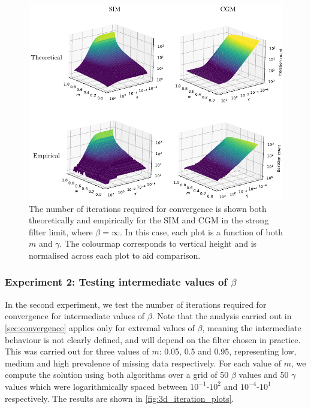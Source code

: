 \begin{figure}[t]
    \begin{center} 
    \includegraphics[width=\linewidth]{Figures/m_gamma_3d_plot.pdf}
    \end{center}
    \caption[Strog Filter Limit convergence experiments]{\small{The number of iterations required for convergence is shown both theoretically and empirically for the SIM and CGM in the strong filter limit, where $\beta=\infty$. In this case, each plot is a function of both $m$ and $\gamma$. The colourmap corresponds to vertical height and is normalised across each plot to aid comparison. }}
    \label{fig:m_gamma_3d_plot}
\end{figure}


\subsubsection{Experiment 2: Testing intermediate values of \texorpdfstring{$\beta$}{beta}}


In the second experiment, we test the number of iterations required for convergence for intermediate values of $\beta$. Note that the analysis carried out in \cref{sec:convergence} applies only for extremal values of $\beta$, meaning the intermediate behaviour is not clearly defined, and will depend on the filter chosen in practice. This was carried out for three values of $m$: 0.05, 0.5 and 0.95, representing low, medium and high prevalence of missing data respectively. For each value of $m$, we compute the solution using both algorithms over a grid of 50 $\beta$ values and 50 $\gamma$ values which were logarithmically spaced between $10^{-1}$-$10^2$ and $10^{-4}$-$10^1$ respectively. The results are shown in \cref{fig:3d_iteration_plots}. 


